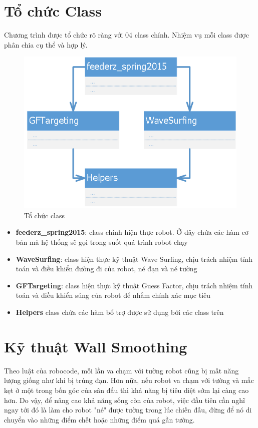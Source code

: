 \documentclass[14pt]{article}
\begin{document}
\section{Tổ chức Class}
Chương trình được tổ chức rõ ràng với 04 class chính. Nhiệm vụ mỗi class được phân chia cụ thể và hợp lý.
\begin{figure}[H]
\centering
\includegraphics[scale=0.5]{images/classStructrure.png}
\caption{Tổ chức class}
\end{figure}
\begin{itemize}
	\item \textbf{feederz\_spring2015}: class chính hiện thực robot. Ở đây chứa các hàm cơ bản mà hệ thống sẽ gọi trong suốt quá trình robot chạy
	\item \textbf{WaveSurfing}: class hiện thực kỹ thuật Wave Surfing, chịu trách nhiệm tính toán và điều khiển đường đi của robot, né đạn và né tường
	\item \textbf{GFTargeting}: class hiện thực kỹ thuật Guess Factor, chịu trách nhiệm tính toán và điều khiển súng của robot để nhắm chính xác mục tiêu
	\item \textbf{Helpers} class chứa các hàm bổ trợ được sử dụng bởi các class trên
\end{itemize}
\section{Kỹ thuật Wall Smoothing}
Theo luật của robocode, mỗi lần va chạm với tường robot cũng bị mất năng lượng giống như khi bị trúng đạn. Hơn nữa, nếu robot va chạm với tường và mắc kẹt ở một trong bốn góc của sân đấu thì khả năng bị tiêu diệt sớm lại càng cao hơn. Do vậy, để nâng cao khả năng sống còn của robot, việc đầu tiên cần nghĩ ngay tới đó là làm cho robot "né" được tường trong lúc chiến đấu, đừng để nó di chuyển vào những điểm chết hoặc những điểm quá gần tường.
\end{document}
